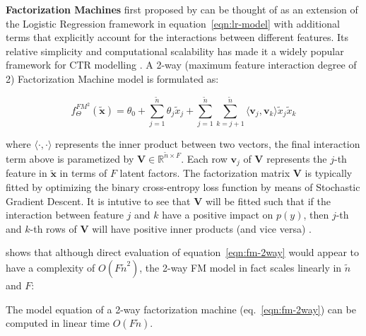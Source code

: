 \documentclass{mldsmsc}
\begin{document}
\textbf{Factorization Machines} first proposed by \cite{RefWorks:rendle2010factorization} can 
be thought of as an extension of the Logistic Regression framework in equation~\ref{eqn:lr-model}
with additional terms that explicitly account for the interactions between different features.
Its relative simplicity and computational scalability has made it a widely popular framework
for CTR modelling \citep{RefWorks:gu2021ad}. 
A 2-way (maximum feature interaction degree of 2) Factorization Machine model is formulated as:

\begin{equation}
\label{eqn:fm-2way}
f_{\Theta}^{FM^2}(\tilde{\mathbf{x}}) = \theta_0 + \sum_{j=1}^{\tilde{n}} \theta_{j} \tilde{x}_j
+ \sum_{j=1}^{\tilde{n}} \sum_{k=j+1}^{\tilde{n}} \langle \mathbf{v}_j , \mathbf{v}_k \rangle \tilde{x}_j \tilde{x}_k
\end{equation}

where $\langle \cdot , \cdot \rangle$ represents the inner product between two vectors, the final
interaction term above is parametized by $\mathbf{V} \in \mathbb{R}^{\tilde{n} \times F}$. Each
row $\mathbf{v}_j$ of $\mathbf{V}$ represents the $j$-th feature in $\tilde{\mathbf{x}}$ in terms
of $F$ latent factors. The factorization matrix $\mathbf{V}$ is typically fitted by optimizing
the binary cross-entropy loss function by means of Stochastic Gradient Descent. It is 
intutive to see that $\mathbf{V}$ will be fitted such that if the interaction
between feature $j$ and $k$ have a positive impact on $p(y)$, then $j$-th and 
$k$-th rows of $\mathbf{V}$ will have positive inner products (and vice versa) \citep{RefWorks:zhang2021deep}.

\cite{RefWorks:rendle2010factorization} shows that although direct evaluation
of equation~\ref{eqn:fm-2way} would appear to have a complexity of $O(F \tilde{n}^2)$, the 2-way
FM model in fact scales linearly in $\tilde{n}$ and $F$:

\begin{lemma}
\label{lemma:fm-linearity}
The model equation of a 2-way factorization machine (eq.~\ref{eqn:fm-2way}) can
be computed in linear time $O(F\tilde{n})$.
\end{lemma}
\end{document}
